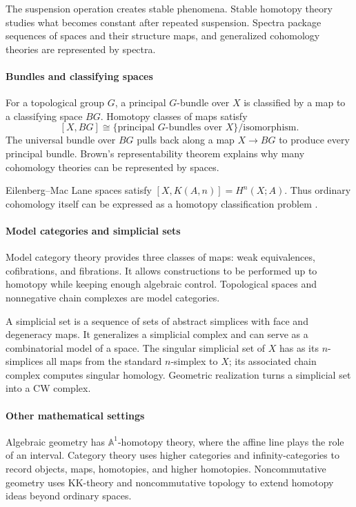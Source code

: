 The suspension operation creates stable phenomena. Stable homotopy theory studies what becomes constant after repeated suspension. Spectra package sequences of spaces and their structure maps, and generalized cohomology theories are represented by spectra.

\paragraph{Bundles and classifying spaces}
For a topological group $G$, a principal $G$-bundle over $X$ is classified by a map to a classifying space $BG$. Homotopy classes of maps satisfy
\[
[X,BG]\cong\{\text{principal }G\text{-bundles over }X\}/\text{isomorphism}.
\]
The universal bundle over $BG$ pulls back along a map $X\to BG$ to produce every principal bundle. Brown's representability theorem explains why many cohomology theories can be represented by spaces.

Eilenberg--Mac Lane spaces satisfy $[X,K(A,n)]=H^n(X;A)$. Thus ordinary cohomology itself can be expressed as a homotopy classification problem \cite{homotopy_theory_ref3}.

\paragraph{Model categories and simplicial sets}
Model category theory provides three classes of maps: weak equivalences, cofibrations, and fibrations. It allows constructions to be performed up to homotopy while keeping enough algebraic control. Topological spaces and nonnegative chain complexes are model categories.

A simplicial set is a sequence of sets of abstract simplices with face and degeneracy maps. It generalizes a simplicial complex and can serve as a combinatorial model of a space. The singular simplicial set of $X$ has as its $n$-simplices all maps from the standard $n$-simplex to $X$; its associated chain complex computes singular homology. Geometric realization turns a simplicial set into a CW complex.

\paragraph{Other mathematical settings}
Algebraic geometry has $\mathbb A^1$-homotopy theory, where the affine line plays the role of an interval. Category theory uses higher categories and infinity-categories to record objects, maps, homotopies, and higher homotopies. Noncommutative geometry uses KK-theory and noncommutative topology to extend homotopy ideas beyond ordinary spaces.

